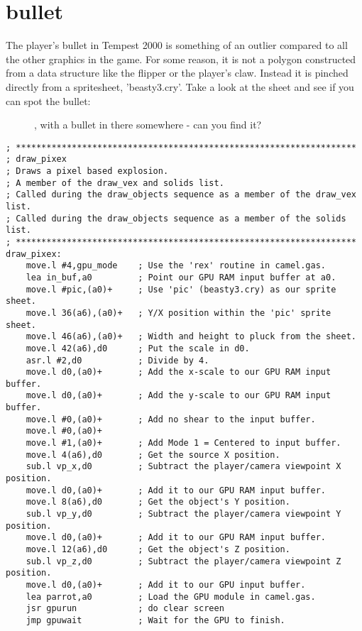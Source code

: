 \chapter{bullet}
\lhead[tempest 2000]{}
\label{sec:bullet}
\lstset{style=68KStyle}

The player's bullet in Tempest 2000 is something of an outlier compared to all the other graphics in the game.
For some reason, it is not a polygon constructed from a data structure like the flipper or the player's claw.
Instead it is pinched directly from a spritesheet, 'beasty3.cry'. Take a look at the sheet and see if you can
spot the bullet:
\begin{figure}[H]
    \centering
    \begin{adjustbox}{width=12cm,center}
    \end{adjustbox}
\caption{, with a bullet in there somewhere - can you find it?}
\end{figure}

\begin{lstlisting}
; *******************************************************************
; draw_pixex
; Draws a pixel based explosion.
; A member of the draw_vex and solids list.
; Called during the draw_objects sequence as a member of the draw_vex list.
; Called during the draw_objects sequence as a member of the solids list.
; *******************************************************************
draw_pixex:
    move.l #4,gpu_mode    ; Use the 'rex' routine in camel.gas.
    lea in_buf,a0         ; Point our GPU RAM input buffer at a0.
    move.l #pic,(a0)+     ; Use 'pic' (beasty3.cry) as our sprite sheet.
    move.l 36(a6),(a0)+   ; Y/X position within the 'pic' sprite sheet.
    move.l 46(a6),(a0)+   ; Width and height to pluck from the sheet.
    move.l 42(a6),d0      ; Put the scale in d0.
    asr.l #2,d0           ; Divide by 4.
    move.l d0,(a0)+       ; Add the x-scale to our GPU RAM input buffer.
    move.l d0,(a0)+       ; Add the y-scale to our GPU RAM input buffer.
    move.l #0,(a0)+       ; Add no shear to the input buffer.
    move.l #0,(a0)+
    move.l #1,(a0)+       ; Add Mode 1 = Centered to input buffer.
    move.l 4(a6),d0       ; Get the source X position.
    sub.l vp_x,d0         ; Subtract the player/camera viewpoint X position.
    move.l d0,(a0)+       ; Add it to our GPU RAM input buffer.
    move.l 8(a6),d0       ; Get the object's Y position.
    sub.l vp_y,d0         ; Subtract the player/camera viewpoint Y position.
    move.l d0,(a0)+       ; Add it to our GPU RAM input buffer.
    move.l 12(a6),d0      ; Get the object's Z position.
    sub.l vp_z,d0         ; Subtract the player/camera viewpoint Z position.
    move.l d0,(a0)+       ; Add it to our GPU input buffer.
    lea parrot,a0         ; Load the GPU module in camel.gas.
    jsr gpurun            ; do clear screen
    jmp gpuwait           ; Wait for the GPU to finish.
\end{lstlisting}

